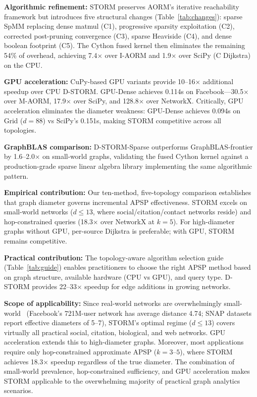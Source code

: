 \documentclass[journal]{IEEEtran}
\begin{document}
\textbf{Algorithmic refinement:} STORM preserves AORM's iterative reachability framework but introduces five structural changes (Table~\ref{tab:changes}): sparse SpMM replacing dense matmul (C1), progressive sparsity exploitation (C2), corrected post-pruning convergence (C3), sparse Heaviside (C4), and dense boolean footprint (C5). The Cython fused kernel then eliminates the remaining 54\% of overhead, achieving 7.4$\times$ over I-AORM and 1.9$\times$ over SciPy (C Dijkstra) on the CPU.

\textbf{GPU acceleration:} CuPy-based GPU variants provide 10--16$\times$ additional speedup over CPU D-STORM. GPU-Dense achieves 0.114s on Facebook---30.5$\times$ over M-AORM, 17.9$\times$ over SciPy, and 128.8$\times$ over NetworkX. Critically, GPU acceleration eliminates the diameter weakness: GPU-Dense achieves 0.094s on Grid ($d=88$) vs SciPy's 0.151s, making STORM competitive across all topologies.

\textbf{GraphBLAS comparison:} D-STORM-Sparse outperforms GraphBLAS-frontier by 1.6--2.0$\times$ on small-world graphs, validating the fused Cython kernel against a production-grade sparse linear algebra library implementing the same algorithmic pattern.

\textbf{Empirical contribution:} Our ten-method, five-topology comparison establishes that graph diameter governs incremental APSP effectiveness. STORM excels on small-world networks ($d \leq 13$, where social/citation/contact networks reside) and hop-constrained queries (18.3$\times$ over NetworkX at $k=5$). For high-diameter graphs without GPU, per-source Dijkstra is preferable; with GPU, STORM remains competitive.

\textbf{Practical contribution:} The topology-aware algorithm selection guide (Table~\ref{tab:guide}) enables practitioners to choose the right APSP method based on graph structure, available hardware (CPU vs GPU), and query type. D-STORM provides 22--33$\times$ speedup for edge additions in growing networks.

\textbf{Scope of applicability:} Since real-world networks are overwhelmingly small-world~\cite{backstrom2012} (Facebook's 721M-user network has average distance 4.74; SNAP datasets report effective diameters of 5--7), STORM's optimal regime ($d \leq 13$) covers virtually all practical social, citation, biological, and web networks. GPU acceleration extends this to high-diameter graphs. Moreover, most applications require only hop-constrained approximate APSP ($k=3$--$5$), where STORM achieves 18.3$\times$ speedup regardless of the true diameter. The combination of small-world prevalence, hop-constrained sufficiency, and GPU acceleration makes STORM applicable to the overwhelming majority of practical graph analytics scenarios.
\end{document}
